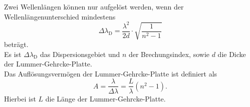 Zwei Wellenlängen können nur aufgelöst werden, wenn der Wellenlängenunterschied mindestens
\begin{equation}
  \label{eqn:dispersionsgebiet}
	\Delta \lambda_{\mathrm{D}} = \frac{\lambda^2}{2d} \cdot \sqrt{\frac{1}{n^2 - 1}}
\end{equation}
beträgt.\\
Es ist $\Delta \lambda_{\mathrm{D}}$ das Dispersionsgebiet und $n$ der Brechungsindex, sowie $d$ die Dicke der Lummer-Gehrcke-Platte.\\
Das Auflösungsvermögen der Lummer-Gehrcke-Platte ist definiert als
\begin{equation}
  \label{eqn:A}
  A=\frac{\lambda}{\Delta \lambda}=\frac{L}{\lambda}\left(n^2-1\right)\mathrm{.}
\end{equation}
Hierbei ist $L$ die Länge der Lummer-Gehrcke-Platte.
